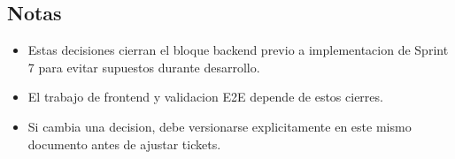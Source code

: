 \subsection{Notas}

\begin{itemize}
  \item Estas decisiones cierran el bloque backend previo a implementacion de Sprint 7 para evitar supuestos durante desarrollo.
  \item El trabajo de frontend y validacion E2E depende de estos cierres.
  \item Si cambia una decision, debe versionarse explicitamente en este mismo documento antes de ajustar tickets.
\end{itemize}
